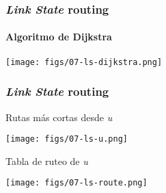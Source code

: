 \documentclass[letter]{beamer}
\begin{document}
\begin{frame}
  \frametitle{{\em Link State} routing}
  \framesubtitle{Algoritmo de Dijkstra}

  \begin{center}
    \texttt{[image: figs/07-ls-dijkstra.png]}
  \end{center}

\end{frame}

\begin{frame}
  \frametitle{{\em Link State} routing}

  Rutas más cortas desde {\em u}
  \begin{center}
    \texttt{[image: figs/07-ls-u.png]}
  \end{center}
  Tabla de ruteo de {\em u}
  \begin{center}
    \texttt{[image: figs/07-ls-route.png]}
  \end{center}

\end{frame}
\end{document}

